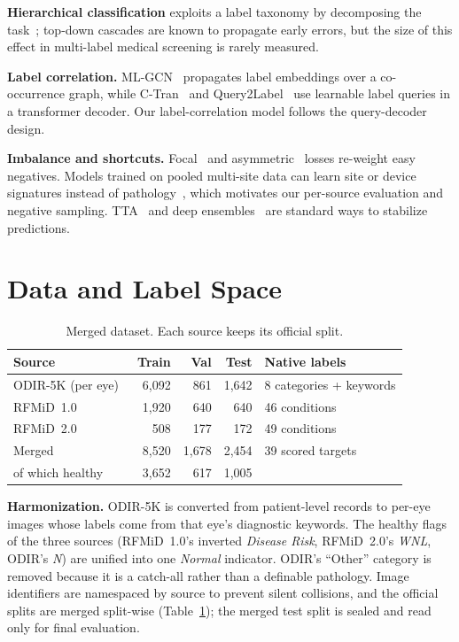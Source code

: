 \documentclass[conference]{IEEEtran}
\begin{document}
\textbf{Hierarchical classification} exploits a label taxonomy by decomposing the
task~\cite{silla2011}; top-down cascades are known to propagate early errors, but
the size of this effect in multi-label medical screening is rarely measured.

\textbf{Label correlation.} ML-GCN~\cite{chen2019} propagates label embeddings over a
co-occurrence graph, while C-Tran~\cite{lanchantin2021} and
Query2Label~\cite{liu2021q2l} use learnable label queries in a transformer decoder.
Our label-correlation model follows the query-decoder design.

\textbf{Imbalance and shortcuts.} Focal~\cite{lin2017} and
asymmetric~\cite{ridnik2021} losses re-weight easy negatives. Models trained on
pooled multi-site data can learn site or device signatures instead of
pathology~\cite{zech2018,geirhos2020}, which motivates our per-source evaluation and
negative sampling. TTA~\cite{shanmugam2021} and deep ensembles~\cite{lakshmi2017}
are standard ways to stabilize predictions.

\section{Data and Label Space}
\begin{table}[t]
\centering
\caption{Merged dataset. Each source keeps its official split.}
\label{tab:data}
\setlength{\tabcolsep}{4pt}
\begin{tabular}{@{}lrrrl@{}}
\toprule
Source & Train & Val & Test & Native labels\\
\midrule
ODIR-5K (per eye)~\cite{odir} & 6{,}092 & 861 & 1{,}642 & 8 categories + keywords\\
RFMiD~1.0~\cite{pachade2021} & 1{,}920 & 640 & 640 & 46 conditions\\
RFMiD~2.0~\cite{panchal2023} & 508 & 177 & 172 & 49 conditions\\
\midrule
Merged & 8{,}520 & 1{,}678 & 2{,}454 & 39 scored targets\\
\quad of which healthy & 3{,}652 & 617 & 1{,}005 & \\
\bottomrule
\end{tabular}
\end{table}

\textbf{Harmonization.} ODIR-5K is converted from patient-level records to per-eye
images whose labels come from that eye's diagnostic keywords. The healthy flags of
the three sources (RFMiD~1.0's inverted \emph{Disease Risk}, RFMiD~2.0's
\emph{WNL}, ODIR's \emph{N}) are unified into one \emph{Normal} indicator. ODIR's
``Other'' category is removed because it is a catch-all rather than a definable
pathology. Image identifiers are namespaced by source to prevent silent collisions,
and the official splits are merged split-wise (Table~\ref{tab:data}); the merged
test split is sealed and read only for final evaluation.
\end{document}
